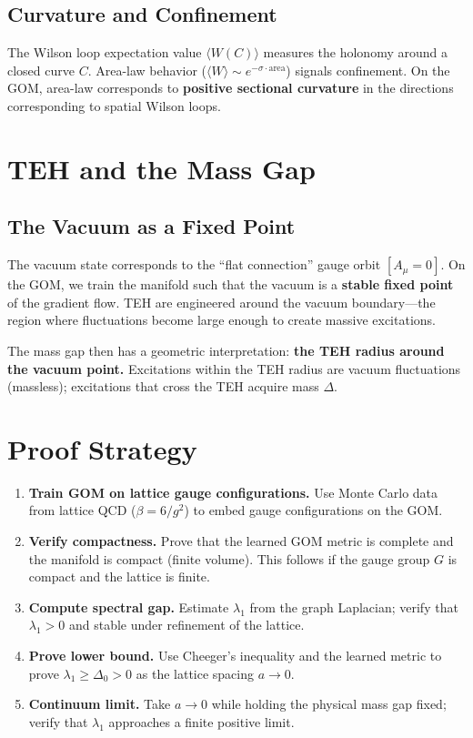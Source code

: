 \documentclass{article}
\begin{document}
\subsection{Curvature and Confinement}

The Wilson loop expectation value $\langle W(C) \rangle$ measures the
holonomy around a closed curve $C$.  Area-law behavior ($\langle W \rangle
\sim e^{-\sigma \cdot \mathrm{area}}$) signals confinement.  On the GOM,
area-law corresponds to \textbf{positive sectional curvature} in the
directions corresponding to spatial Wilson loops.

\section{TEH and the Mass Gap}
\label{sec:teh-ym}

\subsection{The Vacuum as a Fixed Point}

The vacuum state corresponds to the ``flat connection'' gauge orbit
$[A_\mu = 0]$.  On the GOM, we train the manifold such that the vacuum is
a \textbf{stable fixed point} of the gradient flow.  TEH are engineered
around the vacuum boundary---the region where fluctuations become large
enough to create massive excitations.

The mass gap then has a geometric interpretation: \textbf{the TEH radius
around the vacuum point.}  Excitations within the TEH radius are vacuum
fluctuations (massless); excitations that cross the TEH acquire mass
$\Delta$.

\section{Proof Strategy}
\label{sec:proof-strategy}

\begin{enumerate}
  \item \textbf{Train GOM on lattice gauge configurations.}  Use
    Monte Carlo data from lattice QCD ($\beta = 6/g^2$) to embed gauge
    configurations on the GOM.
  \item \textbf{Verify compactness.}  Prove that the learned GOM metric
    is complete and the manifold is compact (finite volume).  This
    follows if the gauge group $G$ is compact and the lattice is finite.
  \item \textbf{Compute spectral gap.}  Estimate $\lambda_1$ from the
    graph Laplacian; verify that $\lambda_1 > 0$ and stable under
    refinement of the lattice.
  \item \textbf{Prove lower bound.}  Use Cheeger's inequality and the
    learned metric to prove $\lambda_1 \geq \Delta_0 > 0$ as the lattice
    spacing $a \to 0$.
  \item \textbf{Continuum limit.}  Take $a \to 0$ while holding the
    physical mass gap fixed; verify that $\lambda_1$ approaches a finite
    positive limit.
\end{enumerate}
\end{document}
